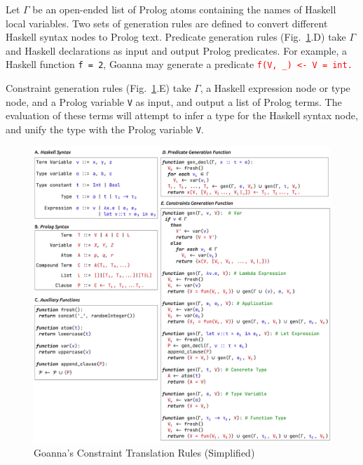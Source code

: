 \documentclass[pdflatex,lineno,sn-nature,Numbered]{sn-jnl}%
\begin{document}
    Let $\Gamma$ be an open-ended list of Prolog atoms containing the names of Haskell local variables. Two sets of generation rules are defined to convert different Haskell syntax nodes to Prolog text. Predicate generation rules (Fig.~\ref{fig:translation}.D) take $\Gamma$ and Haskell declarations as input and output Prolog predicates. For example, a Haskell function \texttt{f = 2}, Goanna may generate a predicate \texttt{\textcolor{red}{f(V, \_) <- V = int.}}
    
    Constraint generation rules (Fig.~\ref{fig:translation}.E) take $\Gamma$, a Haskell expression node or type node, and a Prolog variable \texttt{V} as input, and output a list of Prolog terms. The evaluation of these terms will attempt to infer a type for the Haskell syntax node, and unify the type with the Prolog variable \texttt{V}.
    
    \begin{figure}[ht!]
        \centering
        \includegraphics[width=\linewidth,trim={0 0.5cm 0 0},clip]{images/Generation2}
        \caption{Goanna's Constraint Translation Rules (Simplified)} 
        \label{fig:translation}
    \end{figure}
    
\end{document}
